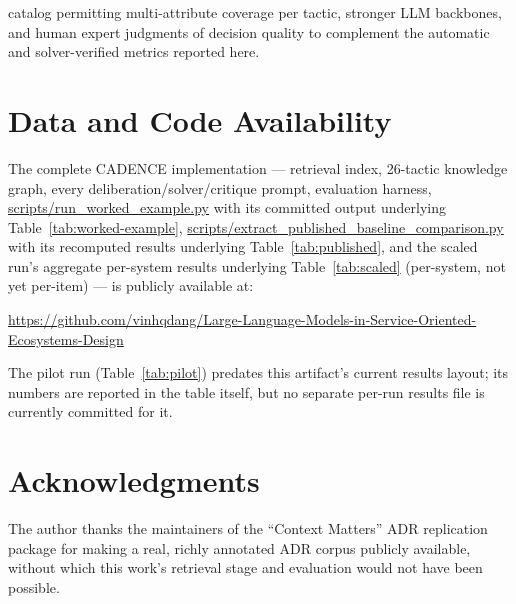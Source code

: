 \documentclass[lettersize,journal]{IEEEtran}
\begin{document}
catalog permitting multi-attribute coverage per tactic, stronger LLM backbones, and human expert judgments of decision quality to complement the automatic and solver-verified metrics reported here.

\section*{Data and Code Availability}
The complete CADENCE implementation --- retrieval index, 26-tactic knowledge graph, every deliberation/solver/critique prompt, evaluation harness, \url{scripts/run_worked_example.py} with its committed output underlying Table~\ref{tab:worked-example}, \url{scripts/extract_published_baseline_comparison.py} with its recomputed results underlying Table~\ref{tab:published}, and the scaled run's aggregate per-system results underlying Table~\ref{tab:scaled} (per-system, not yet per-item) --- is publicly available at:

\begin{center}
\footnotesize\url{https://github.com/vinhqdang/Large-Language-Models-in-Service-Oriented-Ecosystems-Design}
\end{center}

The pilot run (Table~\ref{tab:pilot}) predates this artifact's current results layout; its numbers are reported in the table itself, but no separate per-run results file is currently committed for it.

\section*{Acknowledgments}
The author thanks the maintainers of the ``Context Matters'' ADR replication package for making a real, richly annotated ADR corpus publicly available, without which this work's retrieval stage and evaluation would not have been possible.
\end{document}
